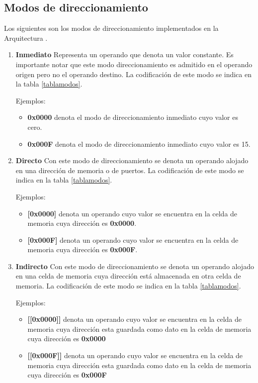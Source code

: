 \subsection{Modos de direccionamiento}
Los siguientes son los modos de direccionamiento implementados en la Arquitectura \Q.
\begin{enumerate}

\item \textbf{Inmediato} Representa un operando que denota un valor constante. Es importante notar que este modo direccionamiento es admitido en el operando origen pero no el operando destino. La codificación de este modo se indica en la tabla \ref{tablamodos}.

Ejemplos:
\begin{itemize}
\item \textbf{0x0000} denota el modo de direccionamiento inmediato cuyo valor es cero.
\item \textbf{0x000F} denota el modo de direccionamiento inmediato cuyo valor es 15.
\end{itemize}


\item \textbf{Directo}
Con este modo de direccionamiento se denota un operando alojado en una dirección de memoria o de puertos. La codificación de este modo se indica en la tabla \ref{tablamodos}.

Ejemplos:
\begin{itemize}
\item \textbf{[0x0000]} denota un operando cuyo valor se encuentra en la celda de memoria cuya dirección es \textbf{0x0000}.
\item \textbf{[0x000F]} denota  un operando cuyo valor se encuentra en la celda de memoria cuya dirección es \textbf{0x000F}.
\end{itemize}


\item \textbf{Indirecto}
Con este modo de direccionamiento se denota un operando alojado en una celda de memoria cuya dirección está almacenada en otra celda de memoria. La codificación de este modo se indica en la tabla \ref{tablamodos}.

Ejemplos:
\begin{itemize}
\item \textbf{[[0x0000]]} denota un operando cuyo valor se encuentra en la celda de memoria cuya dirección esta guardada como dato en la celda de memoria cuya dirección es \textbf{0x0000}
\item \textbf{[[0x000F]]} denota un operando cuyo valor se encuentra en la celda de memoria cuya dirección esta guardada como dato en la celda de memoria cuya dirección es \textbf{0x000F}
\end{itemize}


\end{enumerate}

